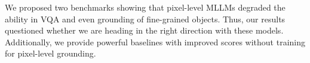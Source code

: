 We proposed two benchmarks showing that pixel-level MLLMs degraded the ability in VQA and even grounding of fine-grained objects. Thus, our results questioned whether we are heading in the right direction with these models. Additionally, we provide powerful baselines with improved scores without training for pixel-level grounding. 